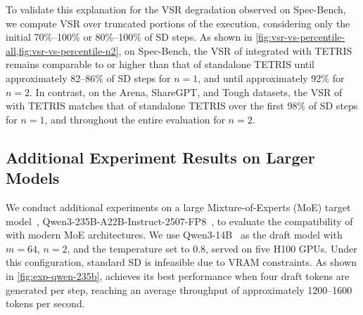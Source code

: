 To validate this explanation for the VSR degradation observed on Spec-Bench, we compute VSR over truncated portions of the execution, considering only the initial 70\%--100\% or 80\%--100\% of SD steps. As shown in \cref{fig:vsr-vs-percentile-all,fig:vsr-vs-percentile-n2}, on Spec-Bench, the VSR of \alg{} integrated with TETRIS remains comparable to or higher than that of standalone TETRIS until approximately 82--86\% of SD steps for $n=1$, and until approximately 92\% for $n=2$.
In contrast, on the Arena, ShareGPT, and Tough datasets, the VSR of \alg{} with TETRIS matches that of standalone TETRIS over the first 98\% of SD steps for $n=1$, and throughout the entire evaluation for $n=2$.


\subsection{Additional Experiment Results on Larger Models}
\label{app:exp-large-model}
We conduct additional experiments on a large Mixture-of-Experts (MoE) target model~\citep{shazeer2017,dai2024deepseekmoe,qwen3technicalreport}, Qwen3-235B-A22B-Instruct-2507-FP8~\citep{qwen3technicalreport}, to evaluate the compatibility of \alg{} with modern MoE architectures. We use Qwen3-14B~\citep{qwen3technicalreport} as the draft model with $m=64$, $n=2$, and the temperature set to $0.8$, served on five H100 GPUs. Under this configuration, standard SD is infeasible due to VRAM constraints.
As shown in \cref{fig:exp-qwen-235b}, \alg{} achieves its best performance when four draft tokens are generated per step, reaching an average throughput of approximately 1200--1600 tokens per second.


